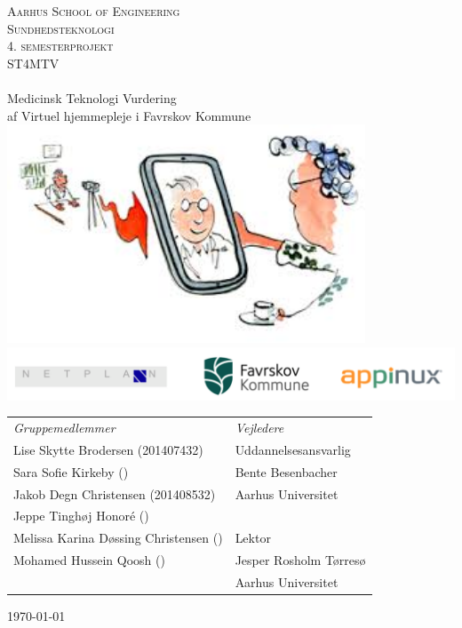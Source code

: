 \begin{titlingpage}
\begin{center}


\textsc{\LARGE Aarhus School of Engineering}\\[1cm]

\textsc{\Large Sundhedsteknologi}\\
\textsc{\Large 4. semesterprojekt}\\
\textsc{\Large ST4MTV}\\[0.5cm]

\noindent\makebox[\linewidth]{\rule{\textwidth}{0.4pt}}\\
[0.5cm]{\Huge Medicinsk Teknologi Vurdering}\\
{af Virtuel hjemmepleje i Favrskov Kommune}
\noindent\makebox[\linewidth]{\rule{\textwidth}{0.4pt}}\\[1cm]

\includegraphics[width=0.8\textwidth]{Figurer/forside}\\
\includegraphics[width=1\textwidth]{Figurer/Snip20160407_38}\\[1.5cm]



\end{center}


\begin{longtabu} to 
	 \textit{Gruppemedlemmer}         &    \textit{Vejledere} \\[-1ex]
	
	Lise Skytte Brodersen (201407432)		&	Uddannelsesansvarlig\\[-2.5ex]
	Sara Sofie Kirkeby ()  		&	Bente Besenbacher \\[-2.5ex]
	Jakob Degn Christensen (201408532) &		Aarhus Universitet \\[-2.5ex]
	Jeppe Tinghøj Honoré () 		&	\\[-2.5ex]
	Melissa Karina Døssing Christensen ()	&	Lektor\\[-2.5ex]
	Mohamed Hussein Qoosh () 	&	Jesper Rosholm Tørresø\\[-2.5ex]
		&	Aarhus Universitet\\[-2.5ex]
\end{longtabu}

\vfill

\begin{center}
{\large \today}
\end{center}


\end{titlingpage}